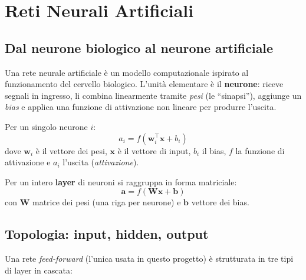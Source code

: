 \documentclass[11pt,a4paper]{article}
\begin{document}
\newpage

\section{Reti Neurali Artificiali}

\subsection{Dal neurone biologico al neurone artificiale}

Una rete neurale artificiale è un modello computazionale ispirato al
funzionamento del cervello biologico. L'unità elementare è il
\textbf{neurone}: riceve segnali in ingresso, li combina linearmente
tramite \emph{pesi} (le ``sinapsi''), aggiunge un \emph{bias} e applica
una funzione di attivazione non lineare per produrre l'uscita.

Per un singolo neurone $i$:
\begin{equation}
    a_i = f(\bm{w}_i^\top \bm{x} + b_i)
\end{equation}
dove $\bm{w}_i$ è il vettore dei pesi, $\bm{x}$ è il vettore di input,
$b_i$ il bias, $f$ la funzione di attivazione e $a_i$ l'uscita
(\emph{attivazione}).

Per un intero \textbf{layer} di neuroni si raggruppa in forma matriciale:
\begin{equation}
    \bm{a} = f(\bm{W}\bm{x} + \bm{b})
\end{equation}
con $\bm{W}$ matrice dei pesi (una riga per neurone) e $\bm{b}$ vettore dei
bias.

\subsection{Topologia: input, hidden, output}

Una rete \emph{feed-forward} (l'unica usata in questo progetto) è
strutturata in tre tipi di layer in cascata:
\end{document}
